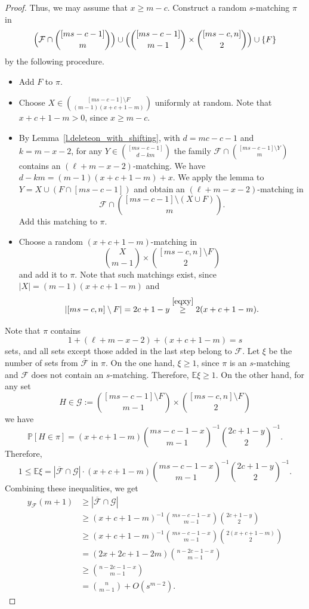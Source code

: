 \documentclass[12pt,a4paper]{article}
\newcommand{\m}{\mathcal}
\begin{document}
\begin{proof}
    Thus, we may assume that $x \geq m - c$. Construct a random $s$-matching $\pi$ in
    \[
    \Bigl(\mathcal{F} \cap {[ms-c-1] \choose m}\Bigr) \cup \Bigl({[ms-c-1] \choose m-1} \times {[ms-c, n] \choose 2}\Bigr) \cup \{F\}
    \]
    by the following procedure.
    \begin{itemize}
        \item Add $F$ to $\pi$.
        \item Choose
        $
        X \in {[ms-c-1] \setminus F \choose (m-1)(x+c+1-m)}
        $
        uniformly at random. Note that $x+c+1-m > 0$, since $x \geq m - c$.
        \item By Lemma~\ref{l.deleteon_with_shifting}, with $d = mc-c-1$ and $k = m-x-2$, for any
        $
        Y \in {[ms-c-1] \choose d-km}
        $
        the family $\mathcal{F} \cap {[ms-c-1] \setminus Y \choose m}$ contains an $(\ell+m-x-2)$-matching. We have $d-km=(m-1)(x+c+1-m) + x$. We apply the lemma to
        $
        Y = X \cup (F \cap [ms-c-1])
        $
        and obtain an $(\ell+m-x-2)$-matching in
        \[
        \mathcal{F} \cap {[ms-c-1] \setminus (X \cup F) \choose m}.
        \]
        Add this matching to $\pi$.
        \item Choose a random $(x+c+1-m)$-matching in
        \[
        {X \choose m-1} \times {[ms-c, n] \setminus F \choose 2}
        \]
        and add it to $\pi$. Note that such matchings exist, since $|X|=(m-1)(x+c+1-m)$ and
        \[
        |[ms-c, n] \setminus F| = 2c+1-y \overset{\eqref{eqxy}}{\geq} 2(x+c+1-m).
        \]
    \end{itemize}

    Note that $\pi$ contains
    \[
    1+(\ell+m-x-2)+(x+c+1-m) = s
    \]
    sets, and all sets except those added in the last step belong to $\mathcal{F}$. Let $\xi$ be the number of sets from $\overline{\mathcal{F}}$ in $\pi$. On the one hand, $\xi \geq 1$, since $\pi$ is an $s$-matching and $\mathcal{F}$ does not contain an $s$-matching. Therefore, $\mathbb{E}\xi \geq 1$. On the other hand, for any set
    \[
    H \in \m G:={[ms-c-1] \setminus F \choose m-1} \times {[ms-c, n] \setminus F \choose 2}
    \]
    we have
    \[
    \mathbb{P}[H \in \pi] = (x+c+1-m){ms-c-1-x \choose m-1}^{-1}{2c+1-y \choose 2}^{-1}.
    \]
    Therefore,
    \[
    1\le \mathbb{E}\xi = |\overline{\mathcal{F}} \cap \m G|
    \cdot (x+c+1-m){ms-c-1-x \choose m-1}^{-1}{2c+1-y \choose 2}^{-1}.
    \]
    Combining these inequalities, we get
    \[
    \begin{split}
        y_{\mathcal{F}}(m+1)
        &\geq |\overline{\mathcal{F}} \cap \m G| \\
        &\geq (x+c+1-m)^{-1}{ms-c-1-x \choose m-1}{2c+1-y \choose 2} \\
        &\geq (x+c+1-m)^{-1}{ms-c-1-x \choose m-1}{2(x+c+1-m) \choose 2} \\
        &= (2x+2c+1-2m){n-2c-1-x \choose m-1} \\
        &\geq {n-2c-1-x \choose m-1} \\
        &= {n \choose m - 1} + O(s^{m - 2}).
    \end{split}
    \]
\end{proof}
\end{document}
